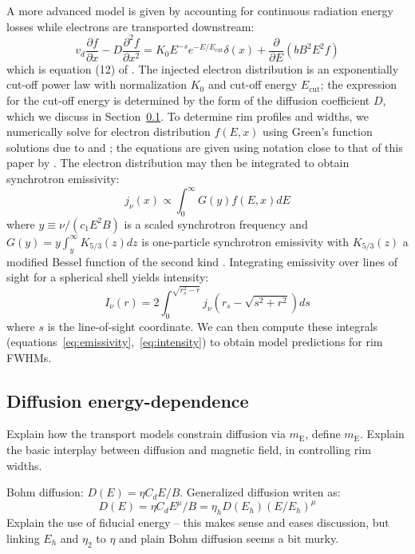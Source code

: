 \documentclass[iop, apj, numberedappendix, twocolappendix]{emulateapj}
\newcommand*{\mt}{\mathrm}
\newcommand*{\ptl}{\partial}
\newcommand*{\mE}{m_\mathrm{E}}
\begin{document}
A more advanced model is given by accounting for continuous radiation energy
losses while electrons are transported downstream:
\begin{equation} \label{eq:full-mod}
    v_d \frac{\ptl f}{\ptl x} - D \frac{\ptl^2 f}{\ptl x^2} =
    K_0 E^{-s} e^{-E/E_{\mt{cut}}} \delta(x) + \frac{\ptl}{\ptl E}
      \left(bB^2E^2f\right)
\end{equation}
which is equation (12) of .  The injected electron
distribution is an exponentially cut-off power law with normalization $K_0$ and
cut-off energy $E_{\mt{cut}}$; the expression for the cut-off energy is
determined by the form of the diffusion coefficient $D$, which we discuss in
Section~\ref{sec:diffcoeff}.  To determine rim profiles and widths, we
numerically solve for electron distribution $f(E,x)$ using Green's function
solutions due to \citet{lerche1980} and \citet{rettig2012}; the equations are
given using notation close to that of this paper by .
The electron distribution may then be integrated to obtain synchrotron
emissivity:
\begin{equation} \label{eq:emissivity}
    j_{\nu}(x) \propto \int_0^\infty G(y) f(E,x) dE
\end{equation}
where $y \equiv \nu/(c_1 E^2 B)$ is a scaled synchrotron frequency and
$G(y) = y \int_y^\infty K_{5/3}(z) dz$ is one-particle synchrotron
emissivity with $K_{5/3}(z)$ a modified Bessel function of the second kind
\citep{pacholczyk1970}.  Integrating emissivity over lines of sight for a
spherical shell yields intensity:
\begin{equation} \label{eq:intensity}
    I_{\nu}(r) = 2 \int_0^{\sqrt{r_s^2 - r}}
                    j_{\nu} \left( r_s - \sqrt{s^2 + r^2} \right) ds
\end{equation}
where $s$ is the line-of-sight coordinate.  We can then compute these
integrals (equations~\eqref{eq:emissivity},~\eqref{eq:intensity}) to obtain
model predictions for rim FWHMs.

\subsection{Diffusion energy-dependence} \label{sec:diffcoeff}

Explain how the transport models constrain diffusion via $\mE$, define $\mE$.
Explain the basic interplay between diffusion and magnetic field, in
controlling rim widths.

Bohm diffusion: $D(E) = \eta C_d E / B$. Generalized diffusion writen as:
\begin{equation}
    D(E) = \eta C_d E^\mu / B = \eta_h D(E_h) (E/E_h)^\mu
\end{equation}
Explain the use of fiducial energy -- this makes sense and eases discussion,
but linking $E_h$ and $\eta_2$ to $\eta$ and plain Bohm diffusion seems a bit
murky.
\end{document}
